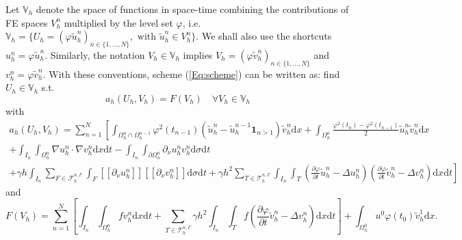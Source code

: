 \documentclass[11pt,a4paper]{article}
\theoremstyle{plain}
\theoremstyle{definition}
\theoremstyle{remark}
\numberwithin{equation}{section}
\newcommand{\dx}{\mathrm{d}x}
\newcommand{\dsigma}{\mathrm{d}\sigma}
\newcommand{\dt}{\mathrm{d}t}
\begin{document}
{Let $\mathbb{V}_h$ denote the space of functions in space-time combining the contributions of FE spaces $V^n_h$ multiplied by the level set $\varphi$, i.e. $\mathbb{V}_h=\{U_h = (\varphi \tilde{u}^n_h)_{n \in \{1, \ldots, N\}},\text{ with } \tilde{u}^n_h\in V^n_h\}$.  We shall also use the shortcuts
$u^n_h = \varphi \tilde{u}^n_h$. Similarly, the notation $V_h\in\mathbb{V}_h$ implies $V_h = (\varphi \tilde{v}^n_h)_{n \in \{1, \ldots, N\}}$ and $v^n_h = \varphi\tilde{v}^n_h$.}
With these conventions, scheme (\ref{Eq:scheme}) can be written as: find $U_h\in\mathbb{V}_h$ s.t.
\[ a_h (U_h, V_h) = F (V_h) \quad \forall V_h\in\mathbb{V}_h \]
with
\begin{multline}
  \label{ahalt} a_h (U_h, V_h) = \sum_{n = 1}^N \left[ \int_{\Omega_h^n \cap
  \Omega_h^{n - 1}} \varphi^2 (t_{n - 1}) (\tilde{u}_h^n - \tilde{u}_h^{n - 1}
  \mathbf{1}_{n > 1}) \tilde{v}_h^n \dx + \int_{\Omega_h^n}
  \frac{\varphi^2 (t_n) - \varphi^2 (t_{n - 1})}{2}  \tilde{u}_h^n  \tilde{v}_h^n
  \dx \right.
\\
 + \int_{I_n} \int_{\Omega_h^n} \nabla u^n_h \cdot \nabla v^n_h \dx
   \dt - \int_{I_n} \int_{\partial \Omega_h^n} \partial_{\nu}{u^n_h} v_h^n \dsigma \dt \\
\left. + \gamma h \int_{I_n}\sum_{F\in\mathcal{F}_h^{n, \Gamma}}  \int_{F}
   [\![\partial_\nu u^n_h]\!] [\![\partial_\nu v_h^n]\!] \dsigma \dt +
   \gamma h^2  \sum_{T\in\mathcal{T}_h^{n,\Gamma}}\int_{I_n} \int_{T} \left(
   \frac{\partial \varphi}{\partial t}  \tilde{u}^n_h - \Delta u^n_h \right)
   \left( \frac{\partial \varphi}{\partial t}  \tilde{v}^n_h - \Delta v_h^n
   \right) \dx \dt \right]
\end{multline}
and
\[ F (V_h) = \sum_{n = 1}^N \left[ \int_{I_n} \int_{\Omega_h^n} fv_h^n \dx \dt + \sum_{T\in\mathcal{T}_h^{n,\Gamma}} \gamma h^2  \int_{I_n} \int_{T} f \left( \frac{\partial \varphi}{\partial t}  \tilde{v}^n_h - \Delta
   v_h^n \right) \dx \dt \right] + \int_{\Omega_h^0} u^0 \varphi (t_0)
   \tilde{v}_h^1 \dx. \]
\end{document}

